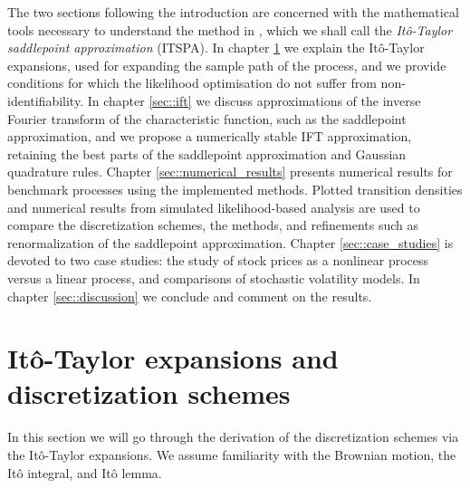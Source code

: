 The two sections following the introduction are concerned with the mathematical tools necessary to understand the method in \citet{preston2012approximation}, which we shall call the \textit{Itô-Taylor saddlepoint approximation} (ITSPA). 
In chapter \ref{sec::ito_taylor} we explain the Itô-Taylor expansions, used for expanding the sample path of the process, 
and we provide conditions for which the likelihood optimisation do not suffer from non-identifiability.
In chapter \ref{sec::ift} we discuss approximations of the inverse Fourier  transform of the characteristic function, such as the saddlepoint approximation, and we propose a numerically stable IFT approximation, retaining the best parts of the saddlepoint approximation and Gaussian quadrature rules.
Chapter \ref{sec::numerical_results} presents numerical results for benchmark processes using the implemented methods.
Plotted transition densities and numerical results from simulated likelihood-based analysis are used to compare the discretization schemes, the methods,  and refinements such as renormalization of the saddlepoint approximation.
Chapter \ref{sec::case_studies} is devoted to two case studies: the study of stock prices as a nonlinear process versus a linear process, and comparisons of stochastic volatility models.
In chapter \ref{sec::discussion} we conclude and comment on the results.\\

\section{Itô-Taylor expansions and discretization schemes}
\label{sec::ito_taylor}

In this section we will go through the derivation of the discretization schemes via the Itô-Taylor expansions.
We assume familiarity with the Brownian motion, the Itô integral, and Itô lemma.

